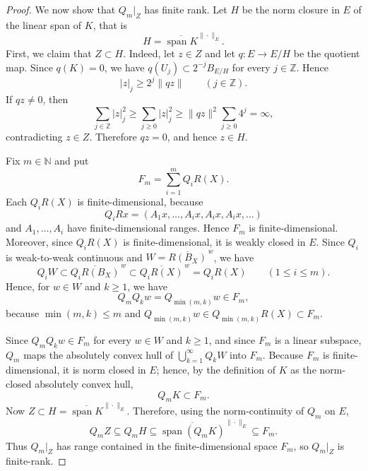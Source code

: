 \documentclass[11pt,reqno]{amsart}
\makeatletter
\theoremstyle{plain}
\theoremstyle{definition}
\newcounter{problempaper}
\newenvironment{problempaperbody}{%
  \setcounter{subsection}{0}%
  \setcounter{subsubsection}{0}%
  \setcounter{paragraph}{0}%
  \renewcommand{\thesubsection}{\arabic{subsection}}%
  \renewcommand{\thesubsubsection}{\thesubsection.\arabic{subsubsection}}%
  \renewcommand{\theparagraph}{\thesubsubsection.\arabic{paragraph}}%
  \let\problem@outersection\section
  \let\problem@outersubsection\subsection
  \let\problem@outersubsubsection\subsubsection
  \let\problem@outerparagraph\paragraph
  \let\section\problem@papersection
  \let\subsection\problem@papersubsection
  \let\subsubsection\problem@papersubsubsection
}{%
  \let\section\problem@outersection
  \let\subsection\problem@outersubsection
  \let\subsubsection\problem@outersubsubsection
  \let\paragraph\problem@outerparagraph
}
\newcommand{\problem@target}[2]{%
  \hypertarget{problem-\theproblempaper-#1-#2}{}%
}
\newcommand{\problem@paperheading}[3]{%
  \par\bigskip
  \problem@target{#1}{#2}%
  \noindent{\large\bfseries #2.\quad #3\par}%
  \nobreak\smallskip
}
\newcommand{\problem@papersubheading}[3]{%
  \par\medskip
  \problem@target{#1}{#2}%
  \noindent{\normalsize\bfseries #2.\quad #3\par}%
  \nobreak\smallskip
}
\newcommand{\problem@papersubsubheading}[3]{%
  \par\smallskip
  \problem@target{#1}{#2}%
  \noindent{\normalsize\itshape #2.\quad #3.\ }%
}
\def\problem@papersection{%
  \@ifstar{\problem@papersectionstar}{\problem@papersectionnostar}%
}
\def\problem@papersectionstar#1{%
  \par\bigskip\noindent{\large\bfseries #1\par}\nobreak\smallskip
}
\def\problem@papersectionnostar#1{%
  \refstepcounter{subsection}%
  \setcounter{subsubsection}{0}%
  \setcounter{paragraph}{0}%
  \problem@paperheading{section}{\thesubsection}{#1}%
  \problem@writecontentsline{section}{\thesubsection}{#1}%
}
\def\problem@papersubsection{%
  \@ifstar{\problem@papersubsectionstar}{\problem@papersubsectionnostar}%
}
\def\problem@papersubsectionstar#1{%
  \par\medskip\noindent{\normalsize\bfseries #1\par}\nobreak\smallskip
}
\def\problem@papersubsectionnostar#1{%
  \refstepcounter{subsubsection}%
  \setcounter{paragraph}{0}%
  \problem@papersubheading{subsection}{\thesubsubsection}{#1}%
  \problem@writecontentsline{subsection}{\thesubsubsection}{#1}%
}
\def\problem@papersubsubsection{%
  \@ifstar{\problem@papersubsubsectionstar}{\problem@papersubsubsectionnostar}%
}
\def\problem@papersubsubsectionstar#1{%
  \par\smallskip\noindent{\normalsize\itshape #1.\ }%
}
\def\problem@papersubsubsectionnostar#1{%
  \refstepcounter{paragraph}%
  \problem@papersubsubheading{subsubsection}{\theparagraph}{#1}%
  \problem@writecontentsline{subsubsection}{\theparagraph}{#1}%
}
\newcommand{\problem@writecontentsline}[3]{%
  \begingroup
  \protected@write\@auxout{}{%
    \string\problemcontentsentry{\theproblempaper}{#1}{#2}{#3}{\thepage}%
  }%
  \endgroup
}
\newcommand{\problemcontentsentry}[5]{%
  \@ifundefined{problemcontents@#1}{%
    \expandafter\gdef\csname problemcontents@#1\endcsname{}%
  }{}%
  \expandafter\g@addto@macro\csname problemcontents@#1\endcsname{%
    \problemcontentsline{#1}{#2}{#3}{#4}{#5}%
  }%
}
\newcommand{\problemcontentslink}[4]{%
  \hyperlink{problem-#1-#2-#3}{#4}%
}
\newcommand{\problemcontentsline}[5]{%
  \ifstrequal{#2}{section}{%
    \par\noindent
    \problemcontentslink{#1}{#2}{#3}{\makebox[2.5em][l]{#3}#4}%
    \nobreak\dotfill
    \problemcontentslink{#1}{#2}{#3}{#5}\par
  }{%
    \ifstrequal{#2}{subsection}{%
      \par\noindent\hspace*{1.5em}%
      \problemcontentslink{#1}{#2}{#3}{\makebox[3.5em][l]{#3}#4}%
      \nobreak\dotfill
      \problemcontentslink{#1}{#2}{#3}{#5}\par
    }{%
      \par\noindent\hspace*{3em}%
      \problemcontentslink{#1}{#2}{#3}{\makebox[4.5em][l]{#3}#4}%
      \nobreak\dotfill
      \problemcontentslink{#1}{#2}{#3}{#5}\par
    }%
  }%
}
\makeatother
\begin{document}
\begin{problempaperbody}
\begin{proof}
We now show that $Q_m|_Z$ has finite rank. Let $H$ be the norm closure in $E$ of the linear span of $K$, that is
\begin{equation*}
        H=\overline{\operatorname{span} K}^{\|\cdot\|_E}.
\end{equation*}
First, we claim that $Z\subset H$. Indeed, let $z\in Z$ and let $q\colon E\to E/H$ be the quotient map. Since $q(K)=0$, we have $q(U_j)\subset 2^{-j}B_{E/H}$ for every $j\in\mathbb Z$. Hence
\begin{equation*}
        |z|_j\geq 2^j\|qz\| \qquad (j\in\mathbb Z).
\end{equation*}
If $qz\ne0$, then
\begin{equation*}
        \sum_{j\in\mathbb Z}|z|_j^2\geq \sum_{j\geq0}|z|_j^2\geq \|qz\|^2\sum_{j\geq0}4^j=\infty,
\end{equation*}
contradicting $z\in Z$. Therefore $qz=0$, and hence $z\in H$.

Fix $m\in\mathbb N$ and put
\begin{equation*}
        F_m=\sum_{i=1}^m Q_iR(X).
\end{equation*}
Each $Q_iR(X)$ is finite-dimensional, because
\begin{equation*}
        Q_iRx=(A_1x,\ldots,A_ix,A_ix,A_ix,\ldots)
\end{equation*}
and $A_1,\ldots,A_i$ have finite-dimensional ranges. Hence $F_m$ is finite-dimensional. Moreover, since $Q_iR(X)$ is finite-dimensional, it is weakly closed in $E$. Since $Q_i$ is weak-to-weak continuous and $W=\overline{R(B_X)}^{\,w}$, we have
\begin{equation*}
        Q_iW\subset \overline{Q_iR(B_X)}^{\,w}\subset \overline{Q_iR(X)}^{\,w}=Q_iR(X) \qquad (1\leq i\leq m).
\end{equation*}
Hence, for $w\in W$ and $k\geq1$, we have
\begin{equation*}
        Q_mQ_kw=Q_{\min(m,k)}w\in F_m,
\end{equation*}
because $\min(m,k)\leq m$ and $Q_{\min(m,k)}w\in Q_{\min(m,k)}R(X)\subset F_m$.

Since $Q_mQ_kw\in F_m$ for every $w\in W$ and $k\geq1$, and since $F_m$ is a linear subspace, $Q_m$ maps the absolutely convex hull of $\bigcup_{k=1}^{\infty}Q_kW$ into $F_m$. Because $F_m$ is finite-dimensional, it is norm closed in $E$; hence, by the definition of $K$ as the norm-closed absolutely convex hull,
\begin{equation*}
        Q_mK\subset F_m.
\end{equation*}
Now $Z\subset H=\overline{\operatorname{span}K}^{\|\cdot\|_E}$. Therefore, using the norm-continuity of $Q_m$ on $E$,
\begin{equation*}
        Q_mZ\subseteq Q_mH \subseteq \overline{\operatorname{span}(Q_mK)}^{\|\cdot\|_E}\subseteq F_m.
\end{equation*}
Thus $Q_m|_Z$ has range contained in the finite-dimensional space $F_m$, so $Q_m|_Z$ is finite-rank.


\end{proof}
\end{problempaperbody}
\end{document}
